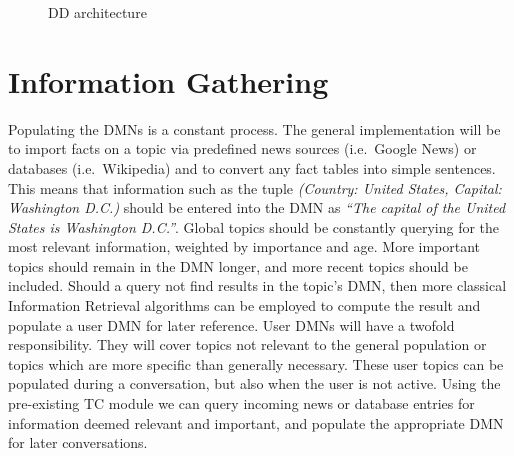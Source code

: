 \documentclass[10pt,twoside,twocolumn]{article}
\begin{document}
\begin{figure}
    \centering
    
    \label{DDdesign}
    \caption{DD architecture}
\end{figure}

\section{Information Gathering \label{section_info}}
Populating the DMNs is a constant process. The general implementation will be to import facts on a topic via predefined news sources (i.e.~Google News) or databases (i.e.~Wikipedia) and to convert any fact tables into simple sentences. This means that information such as the tuple \emph{(Country: United States, Capital: Washington D.C.)} should be entered into the DMN as \emph{``The capital of the United States is Washington D.C.''}. Global topics should be constantly querying for the most relevant information, weighted by importance and age. More important topics should remain in the DMN longer, and more recent topics should be included. Should a query not find results in the topic's DMN, then more classical Information Retrieval algorithms can be employed to compute the result and populate a user DMN for later reference. User DMNs will have a twofold responsibility. They will cover topics not relevant to the general population or topics which are more specific than generally necessary.
These user topics can be populated during a conversation, but also when the user is not active. Using the pre-existing TC module we can query incoming news or database entries for information deemed relevant and important, and populate the appropriate DMN for later conversations. 

\newpage

 
\end{document}
